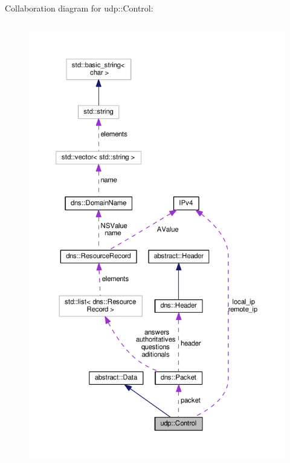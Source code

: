 Collaboration diagram for udp\+:\+:Control\+:\nopagebreak
\begin{figure}[H]
\begin{center}
\leavevmode
\includegraphics[height=550pt]{structudp_1_1Control__coll__graph}
\end{center}
\end{figure}
